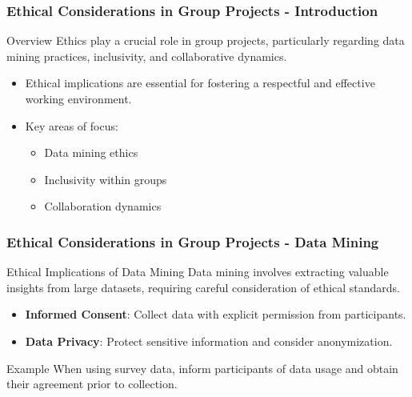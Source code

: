 \documentclass[aspectratio=169]{beamer}
\begin{document}
\begin{frame}[fragile]
    \frametitle{Ethical Considerations in Group Projects - Introduction}
    \begin{block}{Overview}
        Ethics play a crucial role in group projects, particularly regarding data mining practices, inclusivity, and collaborative dynamics.
    \end{block}
    \begin{itemize}
        \item Ethical implications are essential for fostering a respectful and effective working environment.
        \item Key areas of focus:
            \begin{itemize}
                \item Data mining ethics
                \item Inclusivity within groups
                \item Collaboration dynamics
            \end{itemize}
    \end{itemize}
\end{frame}

\begin{frame}[fragile]
    \frametitle{Ethical Considerations in Group Projects - Data Mining}
    \begin{block}{Ethical Implications of Data Mining}
        Data mining involves extracting valuable insights from large datasets, requiring careful consideration of ethical standards.
    \end{block}
    \begin{itemize}
        \item \textbf{Informed Consent}: Collect data with explicit permission from participants.
        \item \textbf{Data Privacy}: Protect sensitive information and consider anonymization.
    \end{itemize}
    \begin{block}{Example}
        When using survey data, inform participants of data usage and obtain their agreement prior to collection.
    \end{block}
\end{frame}
\end{document}
